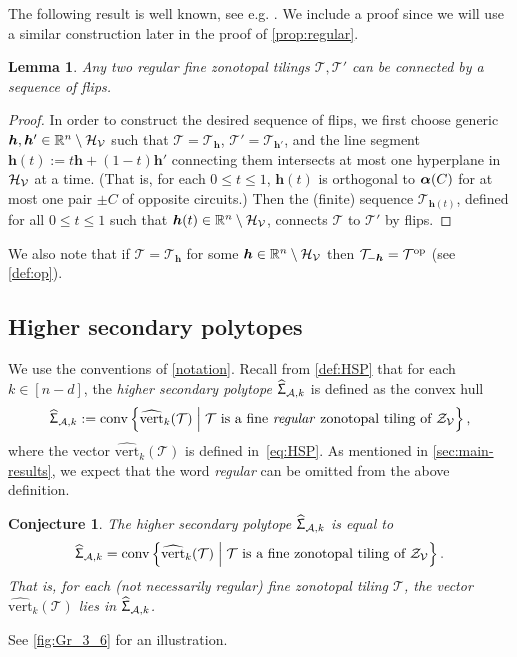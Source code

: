\documentclass[11pt]{amsart}
\theoremstyle{plain}
\newtheorem{lemma}[theorem]{Lemma}
\newtheorem{conjecture}[theorem]{Conjecture}
\theoremstyle{definition}
\def\A{\mathcal{A}}
\def\V{\mathcal{V}}
\def\h{{\bm{h}}}
\def\Conv{\mathrm{conv}}
\def\Zon{\mathcal{Z}}
\newcommand\wh[1]{\hstretch{2}{\hat{\hstretch{0.5}{#1}}}}
\def\vert{\mathrm{vert}}
\def\vertHSP{\wh\vert}
\def\vertHSP{\widehat{\vert}}
\def\HSP{\widehat\Upsigma}
\def\Sigma{\HSP}
\def\VC{\V}
\def\Tcal{\mathcal{T}}
\def\Tiling{\Tcal}
\begin{document}
The following result is well known, see e.g. \cite[Corollary~4.2]{BS}. We include a proof since we will use a similar construction later in the proof of \cref{prop:regular}. 

\begin{lemma}\label{lemma:regular_flips}
Any two regular fine zonotopal tilings $\Tiling,\Tiling'$ can be connected by a sequence of flips. 
\end{lemma}

\begin{proof}
In order to construct the desired sequence of flips, we first choose generic $\h,\h'\in\GHV$ such that $\Tiling=\Tiling_\h$, $\Tiling'=\Tiling_{\h'}$, and the line segment $\h(t):=t\h+(1-t)\h'$ connecting them intersects at most one hyperplane in $\H$ at a time. (That is, for each $0\leq t\leq 1$, $\h(t)$ is orthogonal to $\bm{\alpha}(C)$ for at most one pair $\pm C$ of opposite circuits.) Then the (finite) sequence $\Tiling_{\h(t)}$, defined for all $0\leq t\leq 1$ such that $\h(t)\in\GHV$, connects $\Tiling$ to $\Tiling'$ by flips.
\end{proof}
\noindent We also note that if $\Tiling=\Tiling_\h$ for some $\h\in\GHV$ then $\Tiling_{-\h}=\TilingOP$
(see \cref{def:op}).




\def\Dep{I}
\def\dep{i}
\def\Edep{E}

\subsection{Higher secondary polytopes}\label{sec:higher}
We use the conventions of \cref{notation}.  Recall from 
\cref{def:HSP}
that for each $k\in[n-d]$, the \emph{higher secondary polytope} $\Sigma_{\A,k}$ is defined  as the convex hull
\[\Sigma_{\A,k}:=\Conv\left\{\vertHSP_k(\Tiling)\;\middle|\;  \text{$\Tiling$ is a fine \emph{regular} zonotopal tiling of $\Zon_\VC$} \right\},\]
where the vector $\vertHSP_k(\Tiling)$ is defined in~\eqref{eq:HSP}. As mentioned in \cref{sec:main-results}, we expect that the word \emph{regular} can be omitted from the above definition.
\begin{conjecture}\label{mainconj}
The higher secondary polytope $\Sigma_{\A,k}$ is equal to
\[\Sigma_{\A,k}=\Conv\left\{\vertHSP_k(\Tiling)\;\middle|\;  \text{$\Tiling$ is a fine  zonotopal tiling of $\Zon_\VC$} \right\}.\]
That is, for each (not necessarily regular) fine zonotopal tiling $\Tiling$, the vector $\vertHSP_k(\Tiling)$ lies in $\Sigma_{\A,k}$.
\end{conjecture}
\noindent See \cref{fig:Gr_3_6} for an illustration.
\end{document}
